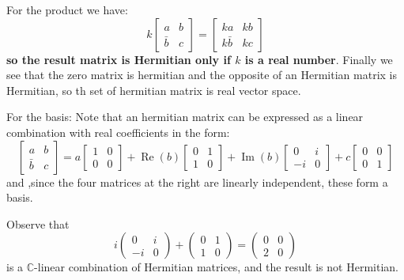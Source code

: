 For the product we have:
\begin{equation}
    k\left[\begin{array}{ll}
a & b \\
\bar{b} & c
\end{array}\right]=\left[\begin{array}{ll}
k a & k b \\
k \bar{b} & k c
\end{array}\right]
\end{equation}
\textbf{so the result matrix is Hermitian only if $k$ is a real number}. Finally we see that the zero matrix is hermitian and the opposite of an Hermitian matrix is Hermitian, so th set of hermitian matrix is real vector space.

For the basis: Note that an hermitian matrix can be expressed as a linear combination with real coefficients in the form:
\begin{equation}
    \left[\begin{array}{ll}
a & b \\
\bar{b} & c
\end{array}\right]=a\left[\begin{array}{ll}
1 & 0 \\
0 & 0
\end{array}\right]+\operatorname{Re}(b)\left[\begin{array}{ll}
0 & 1 \\
1 & 0
\end{array}\right]+\operatorname{Im}(b)\left[\begin{array}{cc}
0 & i \\
-i & 0
\end{array}\right]+c\left[\begin{array}{ll}
0 & 0 \\
0 & 1
\end{array}\right]
\end{equation}
and ,since the four matrices at the right are linearly independent, these form a basis. 

\begin{example}
    Observe that
\begin{equation}
    i\left(\begin{array}{cc}
0 & i \\
-i & 0
\end{array}\right)+\left(\begin{array}{cc}
0 & 1 \\
1 & 0
\end{array}\right)=\left(\begin{array}{cc}
0 & 0 \\
2 & 0
\end{array}\right)
\end{equation}
is a $\mathbb{C}$-linear combination of Hermitian matrices, and the result is not Hermitian.
\end{example}

